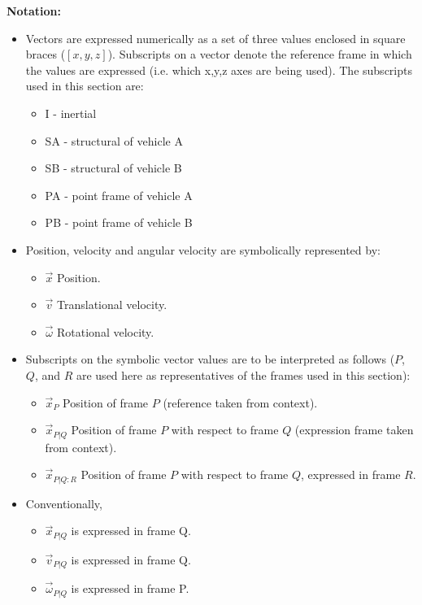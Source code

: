 \begin{description}
\textbf{Notation:}
\begin{itemize}
\item 
Vectors are expressed numerically as a set of three values enclosed in square braces ($[x,y,z]$).
Subscripts on a vector denote the reference frame in which the values are expressed (i.e. which x,y,z axes are being used).
The subscripts used in this section are:
\begin{itemize}
 \item I - inertial
 \item SA - structural of vehicle A
 \item SB - structural of vehicle B
 \item PA - point frame of vehicle A
 \item PB - point frame of vehicle B 
\end{itemize}
\item Position, velocity and angular velocity are symbolically represented by:
\begin{itemize}
 \item $\vec x$ Position.
 \item $\vec v$ Translational velocity.
 \item $\vec \omega$ Rotational velocity.
\end{itemize}
\item Subscripts on the symbolic vector values are to be interpreted as follows ($P$, $Q$, and $R$ are used here as representatives of the frames used in this section):
\begin{itemize}
 \item $\vec x_{P}$ Position of frame $P$ (reference taken from context).
 \item $\vec x_{P|Q}$ Position of frame $P$ with respect to frame $Q$ (expression frame taken from context).
 \item $\vec x_{P|Q:R}$ Position of frame $P$ with respect to frame $Q$, expressed in frame $R$.
\end{itemize}
\item Conventionally,
\begin{itemize}
 \item $\vec x_{P|Q}$ is expressed in frame Q.
 \item $\vec v_{P|Q}$ is expressed in frame Q.
 \item $\vec \omega_{P|Q}$ is expressed in frame P.
\end{itemize}
\end{itemize}




\end{description}
